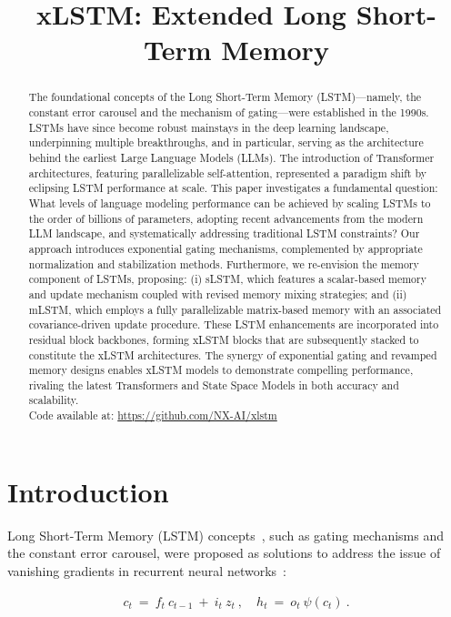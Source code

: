 \title{xLSTM: Extended Long Short-Term Memory}

\begin{abstract}
The foundational concepts of the Long Short-Term Memory (LSTM)—namely, the constant error carousel and the mechanism of gating—were established in the 1990s. LSTMs have since become robust mainstays in the deep learning landscape, underpinning multiple breakthroughs, and in particular, serving as the architecture behind the earliest Large Language Models (LLMs). The introduction of Transformer architectures, featuring parallelizable self-attention, represented a paradigm shift by eclipsing LSTM performance at scale. This paper investigates a fundamental question: What levels of language modeling performance can be achieved by scaling LSTMs to the order of billions of parameters, adopting recent advancements from the modern LLM landscape, and systematically addressing traditional LSTM constraints? Our approach introduces exponential gating mechanisms, complemented by appropriate normalization and stabilization methods. Furthermore, we re-envision the memory component of LSTMs, proposing: (i) sLSTM, which features a scalar-based memory and update mechanism coupled with revised memory mixing strategies; and (ii) mLSTM, which employs a fully parallelizable matrix-based memory with an associated covariance-driven update procedure. These LSTM enhancements are incorporated into residual block backbones, forming xLSTM blocks that are subsequently stacked to constitute the xLSTM architectures. The synergy of exponential gating and revamped memory designs enables xLSTM models to demonstrate compelling performance, rivaling the latest Transformers and State Space Models in both accuracy and scalability.\\
Code available at: \url{https://github.com/NX-AI/xlstm}
\end{abstract}

\section{Introduction}
\label{sec:intro}

Long Short-Term Memory (LSTM) concepts~\citep{Hochreiter:91,Hochreiter:97nips,Hochreiter:97}, such as gating mechanisms and the constant error carousel, were proposed as solutions to address the issue of vanishing gradients in recurrent neural networks~\citep{Hochreiter:91,Hochreiter:00book}:

\begin{align}
\label{eq:lstm_idea}
  c_t \ = \ f_t \ c_{t-1} \ + \ 
          i_t \  z_t \ , \quad  
          h_t \ = \ o_t \ \psi({c_t}) \ . 
\end{align}

